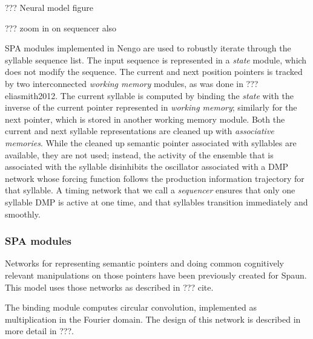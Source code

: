 ??? Neural model figure

??? zoom in on sequencer also

SPA modules implemented in Nengo are used
to robustly iterate through
the syllable sequence list.
The input sequence is represented
in a \textit{state} module,
which does not modify the sequence.
The current and next position pointers
is tracked by two interconnected
\textit{working memory} modules,
as was done in ??? eliasmith2012.
The current syllable is computed
by binding the \textit{state}
with the inverse of the
current pointer represented
in \textit{working memory};
similarly for the next pointer,
which is stored in another
working memory module.
Both the current and next syllable
representations are cleaned up with
\textit{associative memories}.
While the cleaned up semantic pointer
associated with syllables are available,
they are not used;
instead, the activity of the ensemble
that is associated with the syllable
disinhibits the oscillator
associated with a DMP network
whose forcing function
follows the production information trajectory
for that syllable.
A timing network that we call
a \textit{sequencer} ensures
that only one syllable DMP
is active at one time,
and that syllables transition
immediately and smoothly.

\subsubsection{SPA modules}

Networks for representing semantic pointers
and doing common cognitively relevant
manipulations on those pointers
have been previously created
for Spaun.
This model uses those networks
as described in ??? cite.

The binding module computes
circular convolution,
implemented as multiplication
in the Fourier domain.
The design of this network
is described in more detail in
???.

